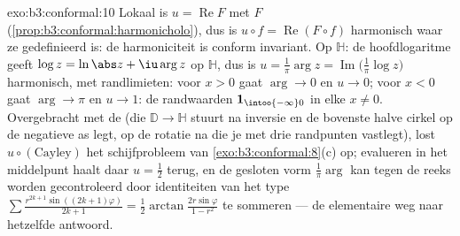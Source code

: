 \begin{solution}{exo:b3:conformal:10}
Lokaal is $u = \operatorname{Re}F$ met $F$ 
(\cref{prop:b3:conformal:harmonicholo}), dus is $u\circ f =
\operatorname{Re}(F\circ f)$ harmonisch waar ze gedefinieerd is:
de harmoniciteit is conform invariant. Op $\mathbb H$: de
hoofdlogaritme geeft $\log z = \ln\abs z + \iu\arg z$  op
$\mathbb H$, dus is $u = \frac1\pi\arg z =
\operatorname{Im}\bigl(\frac1\pi\log z\bigr)$ harmonisch, met
randlimieten: voor $x > 0$ gaat $\arg \to 0$ en $u \to 0$; voor
$x < 0$ gaat $\arg \to \pi$ en $u \to 1$: de randwaarden $\mathbf
1_{\intoo{-\infty}0}$ in elke $x \neq 0$. Overgebracht met de
 (die $\mathbb D \to \mathbb H$ stuurt na
inversie en de bovenste halve cirkel op de negatieve as legt, op
de rotatie na die je met drie randpunten vastlegt), lost
$u\circ(\text{Cayley})$ het schijfprobleem van
\cref{exo:b3:conformal:8}(c) op; evalueren in het middelpunt
haalt daar $u = \frac12$ terug, en de gesloten vorm
$\frac1\pi\arg$ kan tegen de reeks worden gecontroleerd door
identiteiten van het type $\sum\frac{r^{2k+1}\sin((2k+1)
\varphi)}{2k+1} = \frac12\arctan\frac{2r\sin\varphi}{1 - r^2}$ te
sommeren --- de elementaire weg naar hetzelfde antwoord.
\end{solution}

